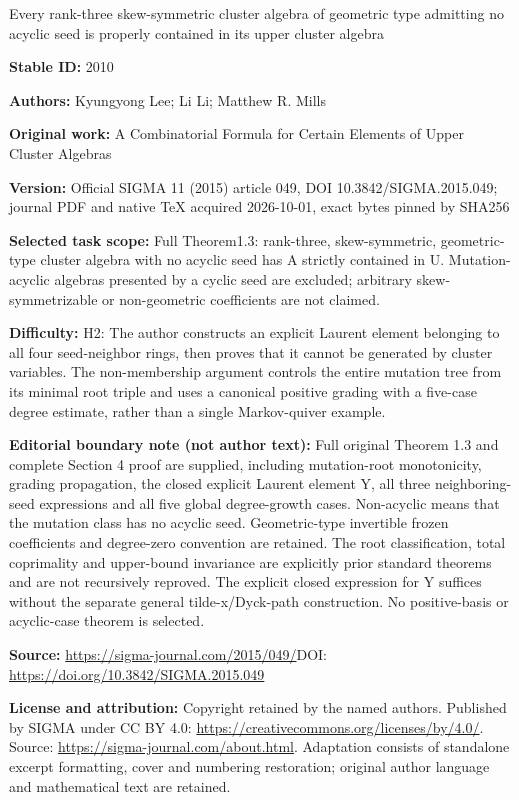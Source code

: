 \documentclass[11pt]{article}
\numberwithin{equation}{section}
\begin{document}
\begin{center}\Large Every rank-three skew-symmetric cluster algebra of geometric type admitting no acyclic seed is properly contained in its upper cluster algebra\end{center}
\noindent\textbf{Stable ID:} 2010\par
\noindent\textbf{Authors:} Kyungyong Lee; Li Li; Matthew R. Mills\par
\noindent\textbf{Original work:} A Combinatorial Formula for Certain Elements of Upper Cluster Algebras\par
\noindent\textbf{Version:} Official SIGMA 11 (2015) article 049, DOI 10.3842/SIGMA.2015.049; journal PDF and native TeX acquired 2026-10-01, exact bytes pinned by SHA256\par
\noindent\textbf{Selected task scope:} Full Theorem1.3: rank-three, skew-symmetric, geometric-type cluster algebra with no acyclic seed has A strictly contained in U. Mutation-acyclic algebras presented by a cyclic seed are excluded; arbitrary skew-symmetrizable or non-geometric coefficients are not claimed.\par
\noindent\textbf{Difficulty:} H2: The author constructs an explicit Laurent element belonging to all four seed-neighbor rings, then proves that it cannot be generated by cluster variables. The non-membership argument controls the entire mutation tree from its minimal root triple and uses a canonical positive grading with a five-case degree estimate, rather than a single Markov-quiver example.\par
\noindent\textbf{Editorial boundary note (not author text):} Full original Theorem 1.3 and complete Section 4 proof are supplied, including mutation-root monotonicity, grading propagation, the closed explicit Laurent element Y, all three neighboring-seed expressions and all five global degree-growth cases. Non-acyclic means that the mutation class has no acyclic seed. Geometric-type invertible frozen coefficients and degree-zero convention are retained. The root classification, total coprimality and upper-bound invariance are explicitly prior standard theorems and are not recursively reproved. The explicit closed expression for Y suffices without the separate general tilde-x/Dyck-path construction. No positive-basis or acyclic-case theorem is selected.\par
\noindent\textbf{Source:} \url{https://sigma-journal.com/2015/049/}\quad DOI: \url{https://doi.org/10.3842/SIGMA.2015.049}\par
\noindent\textbf{License and attribution:} Copyright retained by the named authors. Published by SIGMA under CC BY 4.0: \url{https://creativecommons.org/licenses/by/4.0/}. Source: \url{https://sigma-journal.com/about.html}. Adaptation consists of standalone excerpt formatting, cover and numbering restoration; original author language and mathematical text are retained.\par
\end{document}
